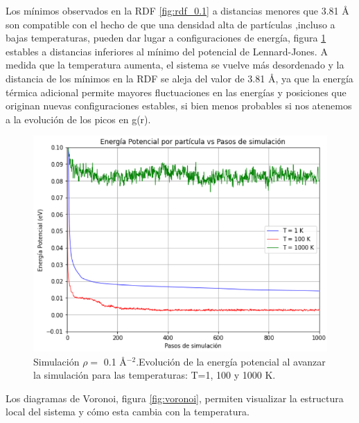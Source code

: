 \vspace{\baselineskip}

Los mínimos observados en la RDF \ref{fig:rdf_0.1} a distancias menores que 3.81 \AA{} son compatible con el hecho de que una densidad alta de partículas ,incluso a bajas temperaturas, pueden dar lugar a configuraciones de energía, figura \ref{fig:energiasxx} estables a distancias inferiores al mínimo del potencial de Lennard-Jones. A medida que la temperatura aumenta, el sistema se vuelve más desordenado y la distancia de los mínimos en la RDF se aleja del valor de 3.81 \AA, ya que la energía térmica adicional permite mayores fluctuaciones en las energías y posiciones que originan nuevas configuraciones estables, si bien menos probables si nos atenemos a la evolución de los picos en g(r).


\begin{figure}[H]
	\centering
	\begin{minipage}[b]{0.60\textwidth}
		\centering
		\includegraphics[width=1\textwidth]{grafico_3x18_0.1_energias_detalle.png}
		\caption{\footnotesize Simulación  $\rho=$ 0.1 \AA$^{-2}$.Evolución de la energía potencial al avanzar la simulación para las temperaturas: T=1, 100 y 1000 K.}
		\label{fig:energiasxx}
	\end{minipage}%
\end{figure}


Los diagramas de Voronoi, figura \ref{fig:voronoi},  permiten visualizar la estructura local del sistema y cómo esta cambia con la temperatura. 

\vspace{\baselineskip}

